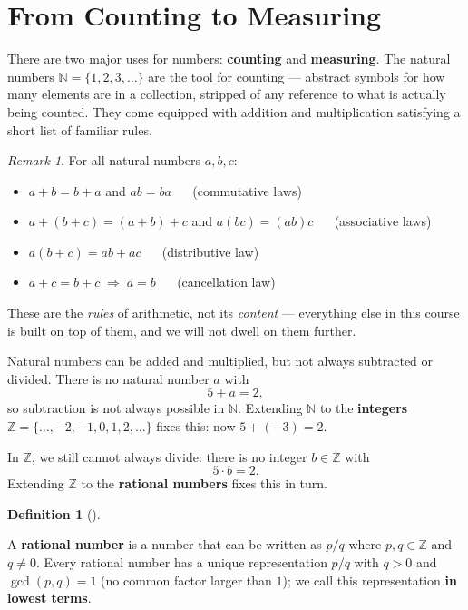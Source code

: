 \documentclass[
  letterpaper,
  DIV=11,
  numbers=noendperiod]{scrreprt}
\providecommand{\tightlist}{%
  \setlength{\itemsep}{0pt}\setlength{\parskip}{0pt}}
\theoremstyle{plain}
\theoremstyle{plain}
\theoremstyle{definition}
\newtheorem{definition}{Definition}[chapter]
\theoremstyle{definition}
\theoremstyle{definition}
\theoremstyle{plain}
\theoremstyle{plain}
\theoremstyle{remark}
\newtheorem{refremark}{Remark}[chapter]
\begin{document}
\section{From Counting to Measuring}\label{from-counting-to-measuring}

There are two major uses for numbers: \textbf{counting} and
\textbf{measuring}. The natural numbers \(\mathbb{N}= \{1,2,3,\dots\}\)
are the tool for counting --- abstract symbols for how many elements are
in a collection, stripped of any reference to what is actually being
counted. They come equipped with addition and multiplication satisfying
a short list of familiar rules.

\begin{refremark}
For all natural numbers \(a,b,c\):

\begin{itemize}
\tightlist
\item
  \(a+b=b+a\) and \(ab=ba\)   (commutative laws)
\item
  \(a+(b+c)=(a+b)+c\) and \(a(bc)=(ab)c\)   (associative laws)
\item
  \(a(b+c)=ab+ac\)   (distributive law)
\item
  \(a+c=b+c \;\Rightarrow\; a=b\)   (cancellation law)
\end{itemize}

These are the \emph{rules} of arithmetic, not its \emph{content} ---
everything else in this course is built on top of them, and we will not
dwell on them further.

\label{rem-arithmetic-laws}

\end{refremark}

Natural numbers can be added and multiplied, but not always subtracted
or divided. There is no natural number \(a\) with \[
5+a=2,
\] so subtraction is not always possible in \(\mathbb{N}\). Extending
\(\mathbb{N}\) to the \textbf{integers}
\(\mathbb{Z}= \{\dots,-2,-1,0,1,2,\dots\}\) fixes this: now
\(5+(-3)=2\).

In \(\mathbb{Z}\), we still cannot always divide: there is no integer
\(b\in\mathbb{Z}\) with \[
5\cdot b = 2 .
\] Extending \(\mathbb{Z}\) to the \textbf{rational numbers} fixes this
in turn.

\begin{definition}[]\protect\hypertarget{def-rational-number}{}\label{def-rational-number}

\hfill\break
A \textbf{rational number} is a number that can be written as \(p/q\)
where \(p,q\in\mathbb{Z}\) and \(q\neq 0\). Every rational number has a
unique representation \(p/q\) with \(q>0\) and \(\gcd(p,q)=1\) (no
common factor larger than \(1\)); we call this representation \textbf{in
lowest terms}.

\end{definition}
\end{document}
